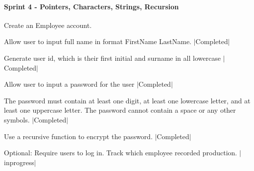 \paragraph*{Sprint 4 -\/ Pointers, Characters, Strings, Recursion}


\begin{DoxyEnumerate}
\item Create an Employee account.
\begin{DoxyItemize}
\item Allow user to input full name in format First\+Name Last\+Name. $\vert$\+Completed$\vert$
\item Generate user id, which is their first initial and surname in all lowercase $\vert$\+Completed$\vert$
\end{DoxyItemize}
\item Allow user to input a password for the user $\vert$\+Completed$\vert$
\begin{DoxyItemize}
\item The password must contain at least one digit, at least one lowercase letter, and at least one uppercase letter. The password cannot contain a space or any other symbols. $\vert$\+Completed$\vert$
\item Use a recursive function to encrypt the password. $\vert$\+Completed$\vert$
\end{DoxyItemize}
\item Optional\+: Require users to log in. Track which employee recorded production. $\vert$inprogress$\vert$ 
\end{DoxyEnumerate}